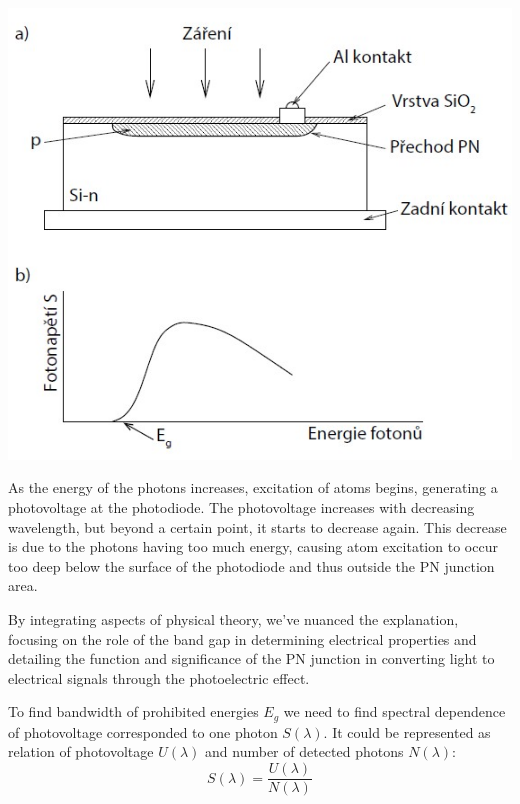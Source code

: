 \documentclass[a4paper,11pt]{article}
\begin{document}
    \begin{minipage}[t]{0.5\textwidth} 
            \vspace{10pt}   
            \par \centering
            \includegraphics[scale=0.5]{scheme}
            \captionsetup{justification=centering, font=footnotesize}
            \label{fig:scheme}
            \vspace{10pt}
            \raggedright   

            \par As the energy of the photons increases, excitation of atoms begins, generating a photovoltage at the photodiode. The photovoltage increases with decreasing wavelength, but beyond a certain point, it starts to decrease again. This decrease is due to the photons having too much energy, causing atom excitation to occur too deep below the surface of the photodiode and thus outside the PN junction area.
            \par By integrating aspects of physical theory, we've nuanced the explanation, focusing on the role of the band gap in determining electrical properties and detailing the function and significance of the PN junction in converting light to electrical signals through the photoelectric effect. 
            \par To find bandwidth of prohibited energies $E_g$ we need to find spectral dependence of photovoltage corresponded to one photon $S(\lambda)$. It could be represented as relation of photovoltage $U(\lambda)$ and number of detected photons $N(\lambda)$:
            \begin{equation}
                S(\lambda) = \frac{U(\lambda)}{N(\lambda)}
            \end{equation}
    \end{minipage}
\end{document}
